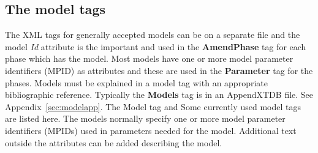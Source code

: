 \documentclass{article}
\begin{document}
\subsection{The model tags}\label{sec:models}

The XML tags for generally accepted models can be on a separate file
and the model {\em Id} attribute is the important and used in the {\bf
  AmendPhase} tag for each phase which has the model.  Most models
have one or more model parameter identifiers (MPID) as attributes and
these are used in the {\bf Parameter} tag for the phases.  Models must
be explained in a model tag with an appropriate bibliographic
reference.  Typically the {\bf Models} tag is in an AppendXTDB file.
See Appendix~\ref{sec:modelapp}.  The Model tag and Some currently
used model tags are listed here.  The models normally specify one or
more model parameter identifiers (MPIDs) used in parameters needed for
the model.  Additional text outside the attributes can be added
describing the model.
\end{document}
